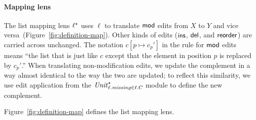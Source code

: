\iflater{} \fi

\paragraph*{Mapping lens}
The list mapping lens $\ell^\star$ uses $\ell$ to translate
$\mathsf{mod}$ edits from $X$ to $Y$ and vice versa\iffull\else\ 
(Figure~\ref{fig:definition-map})\fi.  Other kinds of edits ($\mathsf{ins}$,
$\mathsf{del}$, and $\mathsf{reorder}$) are carried across unchanged.
\ifdissertation
\else
The notation
$c[p \mapsto c_p']$ in the rule for $\mathsf{mod}$ edits means ``the list that is
just like $c$ except that the element in position $p$ is replaced by $c_p'$.''
\fi
When translating non-modification edits, we update the complement in a way
almost identical to the way the two \replicas are updated; to reflect this
similarity, we use edit application from the $\mathit{Unit}_{\ell.\mathit{missing} \in
\ell.C}^\star$ module to define the new complement.

\iffull
\begin{defn}[Map]
Figure~\ref{fig:definition-map} defines the list mapping lens. 
\end{defn}

